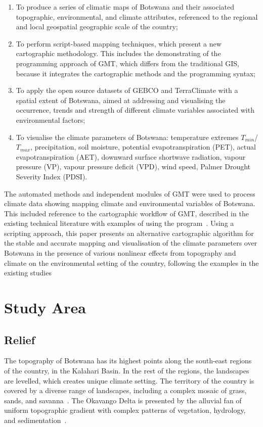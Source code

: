\documentclass[ijgi,article,accept,pdftex,moreauthors]{Definitions/mdpi}
\begin{document}
\begin{enumerate}[label=\roman*]
	\item	To produce a series of climatic maps of Botswana and their associated topographic, environmental, and climate attributes, referenced to the regional and local geospatial geographic scale of the country; 
	\item To perform script-based mapping techniques, which present a new cartographic methodology. This includes the demonstrating of the programming approach of GMT, which differs from the traditional GIS,  because it integrates the cartographic methods and the programming syntax;
	\item To apply the open source datasets of GEBCO and TerraClimate with a spatial extent of Botswana, aimed at addressing and visualising the occurrence, trends and strength of different climate variables associated with environmental factors;
	\item To visualise the climate parameters of Botswana: temperature extremes $T_{min}$/$T_{max}$, precipitation, soil moisture, potential evapotranspiration (PET), actual evapotranspiration (AET), downward surface shortwave radiation, vapour pressure (VP), vapour pressure deficit (VPD), wind speed, Palmer Drought Severity Index (PDSI).
\end{enumerate}
    
The automated methods and independent modules of GMT were used to process climate data showing mapping climate and environmental variables of Botswana. This included reference to the cartographic workflow of GMT, described in the existing technical literature with examples of using the program~\cite{Kasalica,Lemenkova2019106,Lemenkova202205,4814952,Lemenkova201994}. Using a scripting approach, this paper presents an alternative cartographic algorithm for the stable and accurate mapping and visualisation of the climate parameters over Botswana in the presence of various nonlinear effects from topography and climate on the environmental setting of the country, following the examples in the existing studies~\cite{6049609,5649810}

\section{Study Area}

\subsection{Relief}
The topography of Botswana has its highest points along the south-east regions of the country, in the Kalahari Basin. In the rest of the regions, the landscapes are levelled, which creates unique climate setting. The territory of the country is covered by a diverse range of landscapes, including a complex mosaic of grass, sands, and savanna~\cite{Campbell}. The Okavango Delta is presented by the alluvial fan of uniform topographic gradient with complex patterns of vegetation, hydrology, and sedimentation~\cite{Ellery}. 
\end{document}
